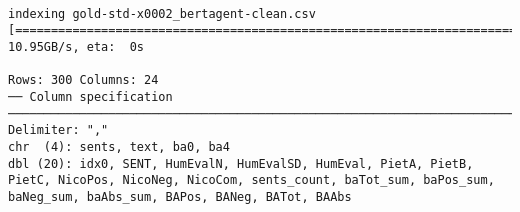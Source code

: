 \documentclass[a4paper,10pt,onecolumn,oneside,openright]{article}
\begin{document}
\begin{verbatim}

indexing gold-std-x0002_bertagent-clean.csv [============================================================================================================================================================] 10.95GB/s, eta:  0s
                                                                                                                                                                                                                                                                 
Rows: 300 Columns: 24
── Column specification ──────────────────────────────────────────────────────────────────────────────────────────────────────────────────────────────────────────────────────────────────────────────────────────────────────
Delimiter: ","
chr  (4): sents, text, ba0, ba4
dbl (20): idx0, SENT, HumEvalN, HumEvalSD, HumEval, PietA, PietB, PietC, NicoPos, NicoNeg, NicoCom, sents_count, baTot_sum, baPos_sum, baNeg_sum, baAbs_sum, BAPos, BANeg, BATot, BAAbs


\end{verbatim}
\end{document}
